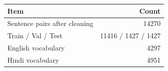 \begin{tabular}{lr}
\toprule
Item & Count \\
\midrule
Sentence pairs after cleaning & 14270 \\
Train / Val / Test & 11416 / 1427 / 1427 \\
English vocabulary & 4297 \\
Hindi vocabulary & 4951 \\
\bottomrule
\end{tabular}
